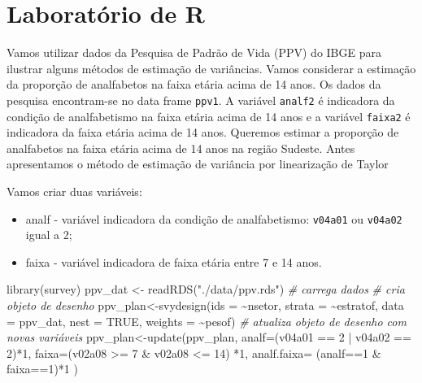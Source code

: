 \documentclass[
  12pt,
  brazilian,
]{book}
\newenvironment{Shaded}{\begin{snugshade}}{\end{snugshade}}
\newcommand{\AttributeTok}[1]{\textcolor[rgb]{0.77,0.63,0.00}{#1}}
\newcommand{\CommentTok}[1]{\textcolor[rgb]{0.56,0.35,0.01}{\textit{#1}}}
\newcommand{\ConstantTok}[1]{\textcolor[rgb]{0.00,0.00,0.00}{#1}}
\newcommand{\DecValTok}[1]{\textcolor[rgb]{0.00,0.00,0.81}{#1}}
\newcommand{\FunctionTok}[1]{\textcolor[rgb]{0.00,0.00,0.00}{#1}}
\newcommand{\NormalTok}[1]{#1}
\newcommand{\OtherTok}[1]{\textcolor[rgb]{0.56,0.35,0.01}{#1}}
\newcommand{\SpecialCharTok}[1]{\textcolor[rgb]{0.00,0.00,0.00}{#1}}
\newcommand{\StringTok}[1]{\textcolor[rgb]{0.31,0.60,0.02}{#1}}
\providecommand{\tightlist}{%
  \setlength{\itemsep}{0pt}\setlength{\parskip}{0pt}}
\theoremstyle{definition}
\theoremstyle{definition}
\theoremstyle{definition}
\theoremstyle{definition}
\theoremstyle{remark}
\begin{document}
\hypertarget{laboratuxf3rio-de-r}{%
\section{Laboratório de R}\label{laboratuxf3rio-de-r}}

Vamos utilizar dados da Pesquisa de Padrão de Vida (PPV) do IBGE para ilustrar alguns métodos de estimação de variâncias. Vamos considerar a estimação da proporção de analfabetos na faixa etária acima de 14 anos. Os dados da pesquisa encontram-se no data frame \texttt{ppv1}. A variável \texttt{analf2} é indicadora da condição
de analfabetismo na faixa etária acima de 14 anos e a variável \texttt{faixa2} é indicadora da faixa etária acima de 14 anos. Queremos estimar a proporção de analfabetos na faixa etária acima de 14 anos na região Sudeste. Antes apresentamos o método de estimação de variância por linearização de Taylor

Vamos criar duas variáveis:

\begin{itemize}
\tightlist
\item
  analf - variável indicadora da condição de analfabetismo: \texttt{v04a01} ou
  \texttt{v04a02} igual a 2;
\item
  faixa - variável indicadora de faixa etária entre 7 e 14 anos.
\end{itemize}

\begin{Shaded}
\begin{Highlighting}[]
\FunctionTok{library}\NormalTok{(survey)}
\NormalTok{ppv\_dat }\OtherTok{\textless{}{-}} \FunctionTok{readRDS}\NormalTok{(}\StringTok{"./data/ppv.rds"}\NormalTok{) }\CommentTok{\# carrega dados}
\CommentTok{\# cria objeto de desenho}
\NormalTok{ppv\_plan}\OtherTok{\textless{}{-}}\FunctionTok{svydesign}\NormalTok{(}\AttributeTok{ids =} \SpecialCharTok{\textasciitilde{}}\NormalTok{nsetor, }\AttributeTok{strata =} \SpecialCharTok{\textasciitilde{}}\NormalTok{estratof,}
\AttributeTok{data =}\NormalTok{ ppv\_dat, }\AttributeTok{nest =} \ConstantTok{TRUE}\NormalTok{, }\AttributeTok{weights =} \SpecialCharTok{\textasciitilde{}}\NormalTok{pesof)}
\CommentTok{\# atualiza objeto de desenho com novas variáveis}
\NormalTok{ppv\_plan}\OtherTok{\textless{}{-}}\FunctionTok{update}\NormalTok{(ppv\_plan,}
  \AttributeTok{analf=}\NormalTok{(v04a01 }\SpecialCharTok{==} \DecValTok{2} \SpecialCharTok{|}\NormalTok{ v04a02 }\SpecialCharTok{==} \DecValTok{2}\NormalTok{)}\SpecialCharTok{*}\DecValTok{1}\NormalTok{,}
  \AttributeTok{faixa=}\NormalTok{(v02a08 }\SpecialCharTok{\textgreater{}=} \DecValTok{7} \SpecialCharTok{\&}\NormalTok{ v02a08 }\SpecialCharTok{\textless{}=} \DecValTok{14}\NormalTok{) }\SpecialCharTok{*}\DecValTok{1}\NormalTok{,}
  \AttributeTok{analf.faixa=}\NormalTok{ (analf}\SpecialCharTok{==}\DecValTok{1} \SpecialCharTok{\&}\NormalTok{ faixa}\SpecialCharTok{==}\DecValTok{1}\NormalTok{)}\SpecialCharTok{*}\DecValTok{1}
\NormalTok{)}
\end{Highlighting}
\end{Shaded}
\end{document}
